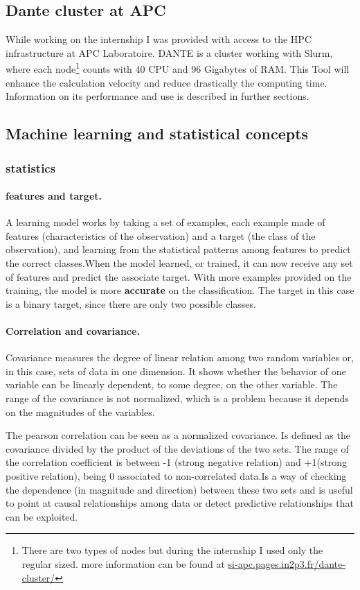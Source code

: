 \documentclass{article}
\begin{document}
\subsection{Dante cluster at APC}
While working on the internship I was provided with access to the HPC infrastructure at APC Laboratoire. DANTE is a cluster working with Slurm, where each node\footnote{There are two types of nodes but during the internship I used only the regular sized. more information can be found at \url{si-apc.pages.in2p3.fr/dante-cluster/}} counts with 40 CPU and 96 Gigabytes of RAM. This Tool will enhance the calculation velocity and reduce drastically the computing time. Information on its performance and use is described in further sections.
\subsection{Machine learning and statistical concepts}


\subsubsection{statistics}
\paragraph{features and target.} A learning model works by taking a set of examples, each example made of features (characteristics of the observation) and a target (the class of the observation), and learning from the statistical patterns among features to predict the correct classes.When the model learned, or trained, it can now receive any set of features and predict the associate target. With more examples provided on the training, the model is more \textbf{accurate} on the classification. The target in this case is a binary target, since there are only two possible classes.
\paragraph{Correlation and covariance.}
Covariance measures the degree of linear relation among two  random variables or, in this case, sets of data in one dimension. It shows whether the behavior of one variable can be linearly dependent, to some degree, on the other variable. The range of the covariance is not normalized, which is a problem because it depends on the magnitudes of the variables.  

The pearson correlation can be seen as a normalized covariance. Is defined as the covariance divided by the product of the deviations of the two sets. The range of the correlation coefficient is between -1 (strong negative relation) and +1(strong positive relation), being 0 associated to non-correlated data.Is a way of checking the dependence (in magnitude and direction) between these two sets and is useful to point at causal relationships among data or detect predictive relationships that can be exploited. 
\end{document}
